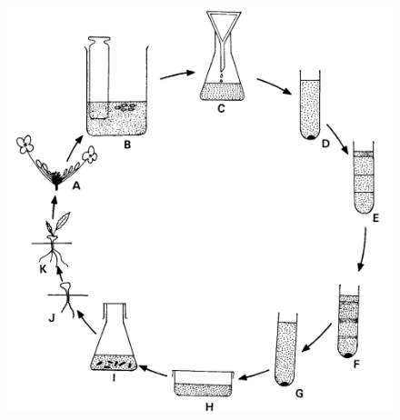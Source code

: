 \documentclass[
  ignorenonframetext,
  aspectratio=169]{beamer}
\begin{document}
\begin{frame}{}
\protect\hypertarget{section-13}{}
\begin{figure}
  \begin{columns}[T,onlytextwidth]

  \begin{center}
  \includegraphics[width=0.98\linewidth]{../images/isolated_pollen_culture.png}
  \end{center}
  

\end{columns}
\end{figure}
\end{frame}
\end{document}
